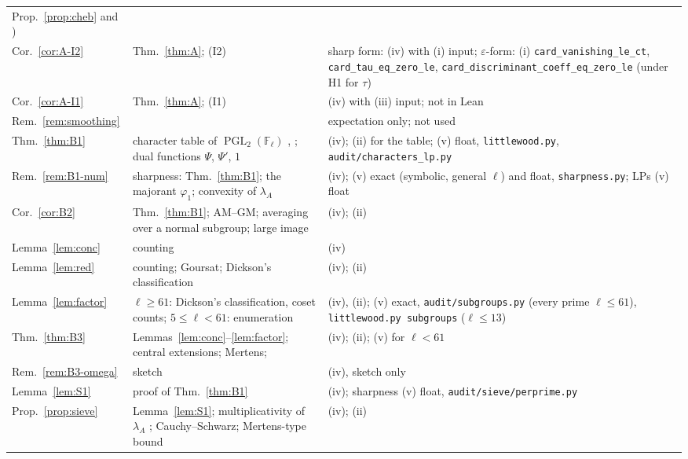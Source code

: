 \documentclass[11pt]{amsart}
\theoremstyle{definition}
\theoremstyle{remark}
\newcommand{\F}{\mathbb{F}}
\DeclareMathOperator{\PGL}{PGL}
\begin{document}
{\begin{longtable}{@{}>{\raggedright\arraybackslash}p{}>{\raggedright\arraybackslash}p{}>{\raggedright\arraybackslash}p{}@{}}
  Prop.~\ref{prop:cheb} and \cite[Prop.~6]{Serre81}) \\
Cor.~\ref{cor:A-I2} & Thm.~\ref{thm:A}; (I2) & sharp form: (iv) with (i) input; $\varepsilon$-form: (i)
  \texttt{card\_\allowbreak{}vanishing\_\allowbreak{}le\_\allowbreak{}ct}, \texttt{card\_\allowbreak{}tau\_\allowbreak{}eq\_\allowbreak{}zero\_\allowbreak{}le},
  \texttt{card\_\allowbreak{}discriminant\_\allowbreak{}coeff\_\allowbreak{}eq\_\allowbreak{}zero\_\allowbreak{}le} (under H1 for $\tau$) \\
Cor.~\ref{cor:A-I1} & Thm.~\ref{thm:A}; (I1) & (iv) with (iii) input; not in Lean \\
Rem.~\ref{rem:smoothing} & \cite[Thms.~2.2--2.3]{Zyw15} & expectation only; not used \\
Thm.~\ref{thm:B1} & character table of $\PGL_2(\F_\ell)$ \cite[\S5.2]{FH}, \cite{PS83}; dual functions $\Psi$, $\Psi'$, $1$
  & (iv); (ii) for the table; (v) float, \texttt{littlewood.py}, \texttt{audit/\allowbreak{}characters\_\allowbreak{}lp.py} \\
Rem.~\ref{rem:B1-num} & sharpness: Thm.~\ref{thm:B1}; the majorant $\varphi_1$; convexity of $\lambda_A$
  & (iv); (v) exact (symbolic, general $\ell$) and float, \texttt{sharpness.py}; LPs (v) float \\
Cor.~\ref{cor:B2} & Thm.~\ref{thm:B1}; AM--GM; averaging over a normal subgroup; large image & (iv); (ii) \\
Lemma~\ref{lem:conc} & counting & (iv) \\
Lemma~\ref{lem:red} & counting; Goursat; Dickson's classification \cite{Dic01,Hup67} & (iv); (ii) \\
Lemma~\ref{lem:factor} & $\ell\ge61$: Dickson's classification, coset counts; $5\le\ell<61$: enumeration
  & (iv), (ii); (v) exact, \texttt{audit/\allowbreak{}subgroups.py} (every prime $\ell\le61$), \texttt{littlewood.py subgroups}
  ($\ell\le13$) \\
Thm.~\ref{thm:B3} & Lemmas~\ref{lem:conc}--\ref{lem:factor}; central extensions; Mertens; \cite{Rib85,Loe17}
  & (iv); (ii); (v) for $\ell<61$ \\
Rem.~\ref{rem:B3-omega} & sketch & (iv), sketch only \\
Lemma~\ref{lem:S1} & proof of Thm.~\ref{thm:B1} & (iv); sharpness (v) float, \texttt{audit/\allowbreak{}sieve/\allowbreak{}perprime.py} \\
Prop.~\ref{prop:sieve} & Lemma~\ref{lem:S1}; multiplicativity of $\lambda_A$ \cite[Prop.~6]{Bel16};
  Cauchy--Schwarz; Mertens-type bound & (iv); (ii) \\

\end{longtable}}
\end{document}
